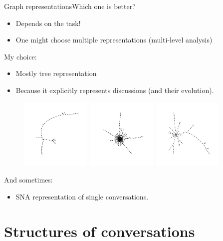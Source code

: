 \documentclass{beamer}
\begin{document}
\begin{frame}{Graph representations}{Which one is better?}

\begin{itemize}
\item Depends on the task!
\item One might choose multiple representations (multi-level analysis)
\end{itemize}
\vfill
My choice: 
\begin{itemize}
\item Mostly tree representation
\item Because it explicitly represents discussions (and their evolution).
\end{itemize}
\begin{figure}
	\centering
	\includegraphics[width=0.3\textwidth]{tree1}	
	\includegraphics[width=0.3\textwidth]{tree2}	
	\includegraphics[width=0.3\textwidth]{tree4}	
\end{figure}
And sometimes:
\begin{itemize}
\item SNA representation of single conversations.
\end{itemize}
\end{frame}

\section{Structures of conversations}
\end{document}
